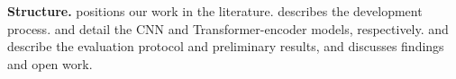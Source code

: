 \noindent \textbf{Structure.}  positions our work in the literature.  describes the development process.  and  detail the CNN and Transformer-encoder models, respectively.  and  describe the evaluation protocol and preliminary results, and  discusses findings and open work.

